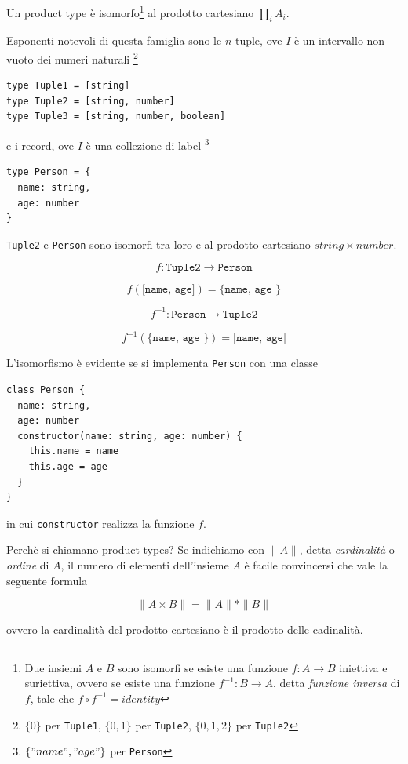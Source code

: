 \documentclass[12pt]{article}
\begin{document}
Un product type è isomorfo\footnote{Due insiemi $A$ e $B$ sono isomorfi se esiste una funzione $f: A \rightarrow B$ iniettiva e suriettiva,
ovvero se esiste una funzione $f^{-1}: B \rightarrow A$, detta \emph{funzione inversa} di $f$, tale che $f \circ f^{-1} = identity$}
al prodotto cartesiano $\prod_i A_i$.

Esponenti notevoli di questa famiglia sono le $n$-tuple, ove $I$ è un intervallo non vuoto dei numeri naturali
\footnote{$\{0\}$ per \texttt{Tuple1}, $\{0, 1\}$ per \texttt{Tuple2}, $\{0, 1, 2\}$ per \texttt{Tuple2}}

\begin{verbatim}
type Tuple1 = [string]
type Tuple2 = [string, number]
type Tuple3 = [string, number, boolean]
\end{verbatim}

e i record, ove $I$ è una collezione di label
\footnote{$\{ "name", "age" \}$ per \texttt{Person}}

\begin{verbatim}
type Person = {
  name: string,
  age: number
}
\end{verbatim}

\texttt{Tuple2} e \texttt{Person} sono isomorfi tra loro e al prodotto cartesiano $string \times number$.

$$
f: \texttt{Tuple2} \rightarrow \texttt{Person}
$$

$$
f(\texttt{[name, age]}) = \texttt{\{ name, age  \}}
$$

$$
f^{-1}: \texttt{Person} \rightarrow \texttt{Tuple2}
$$

$$
f^{-1}(\texttt{\{ name, age  \}}) = \texttt{[name, age]}
$$

L'isomorfismo è evidente se si implementa \texttt{Person} con una classe

\begin{verbatim}
class Person {
  name: string,
  age: number
  constructor(name: string, age: number) {
    this.name = name
    this.age = age
  }
}
\end{verbatim}

in cui \texttt{constructor} realizza la funzione $f$.

Perchè si chiamano product types? Se indichiamo con $\|A\|$, detta \emph{cardinalità} o \emph{ordine} di $A$, il numero di elementi
dell'insieme $A$ è facile convincersi che vale la seguente formula

$$
\|A \times B\| = \|A\| * \|B\|
$$

ovvero la cardinalità del prodotto cartesiano è il prodotto delle cadinalità.
\end{document}
